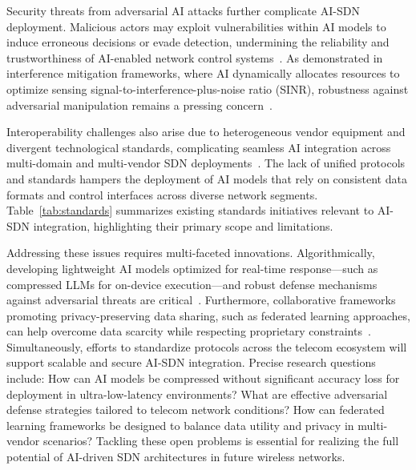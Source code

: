 \documentclass[sigconf]{acmart}
\begin{document}
Security threats from adversarial AI attacks further complicate AI-SDN deployment. Malicious actors may exploit vulnerabilities within AI models to induce erroneous decisions or evade detection, undermining the reliability and trustworthiness of AI-enabled network control systems~\cite{ref48}. As demonstrated in interference mitigation frameworks, where AI dynamically allocates resources to optimize sensing signal-to-interference-plus-noise ratio (SINR), robustness against adversarial manipulation remains a pressing concern~\cite{ref48}.

Interoperability challenges also arise due to heterogeneous vendor equipment and divergent technological standards, complicating seamless AI integration across multi-domain and multi-vendor SDN deployments~\cite{ref7}. The lack of unified protocols and standards hampers the deployment of AI models that rely on consistent data formats and control interfaces across diverse network segments. Table~\ref{tab:standards} summarizes existing standards initiatives relevant to AI-SDN integration, highlighting their primary scope and limitations.

Addressing these issues requires multi-faceted innovations. Algorithmically, developing lightweight AI models optimized for real-time response—such as compressed LLMs for on-device execution—and robust defense mechanisms against adversarial threats are critical~\cite{ref7,ref52,ref48}. Furthermore, collaborative frameworks promoting privacy-preserving data sharing, such as federated learning approaches, can help overcome data scarcity while respecting proprietary constraints~\cite{ref7}. Simultaneously, efforts to standardize protocols across the telecom ecosystem will support scalable and secure AI-SDN integration. Precise research questions include: How can AI models be compressed without significant accuracy loss for deployment in ultra-low-latency environments? What are effective adversarial defense strategies tailored to telecom network conditions? How can federated learning frameworks be designed to balance data utility and privacy in multi-vendor scenarios? Tackling these open problems is essential for realizing the full potential of AI-driven SDN architectures in future wireless networks.
\end{document}
